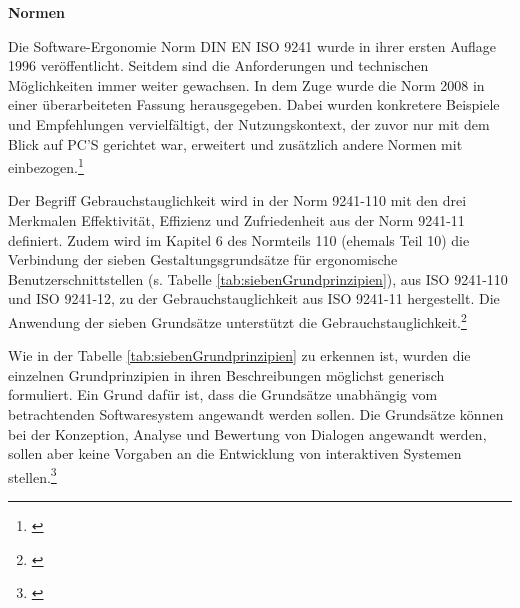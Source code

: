 \textbf{Normen}

Die Software-Ergonomie Norm \gls{DIN} \gls{EN} \gls{ISO} 9241 wurde in ihrer ersten Auflage 1996 veröffentlicht. Seitdem sind die Anforderungen und technischen Möglichkeiten immer weiter gewachsen. In dem Zuge wurde die Norm 2008 in einer überarbeiteten Fassung herausgegeben. Dabei wurden konkretere Beispiele und Empfehlungen vervielfältigt, der Nutzungskontext, der zuvor nur mit dem Blick auf PC'S gerichtet war, erweitert und zusätzlich andere Normen mit einbezogen.\footnote{\cite[vgl.][]{Schneider2008}}

Der Begriff Gebrauchstauglichkeit wird in der Norm 9241-110 mit den drei Merkmalen Effektivität, Effizienz und Zufriedenheit aus der Norm 9241-11 definiert. Zudem wird im Kapitel 6 des Normteils 110 (ehemals Teil 10) die Verbindung der sieben Gestaltungsgrundsätze für ergonomische Benutzerschnittstellen (s. Tabelle \ref{tab:siebenGrundprinzipien}), aus ISO 9241-110 und ISO 9241-12, zu der Gebrauchstauglichkeit aus ISO 9241-11 hergestellt. Die Anwendung der sieben Grundsätze unterstützt die Gebrauchstauglichkeit.\footnote{\cite[vgl.][Kap. 6]{ISO9241-110}}

Wie in der Tabelle \ref{tab:siebenGrundprinzipien} zu erkennen ist, wurden die einzelnen Grundprinzipien in ihren Beschreibungen möglichst generisch formuliert. Ein Grund dafür ist, dass die Grundsätze unabhängig vom betrachtenden Softwaresystem angewandt werden sollen. Die Grundsätze können bei der Konzeption, Analyse und Bewertung von Dialogen angewandt werden, sollen aber keine Vorgaben an die Entwicklung von interaktiven Systemen stellen.\footnote{\cite[vgl.][Kap. 4.1]{ISO9241-110}}

